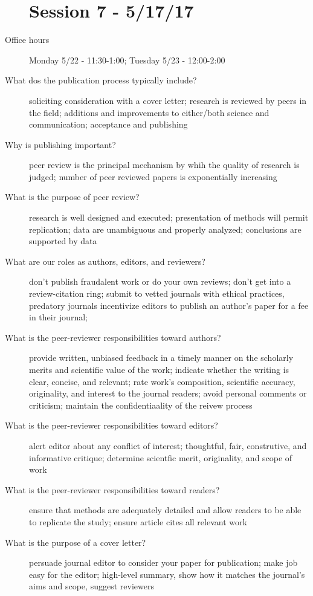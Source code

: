 \documentclass[10pt]{article}
\begin{document}
\begin{description}
\section{Session 7 - 5/17/17}
\item[Office hours]
    Monday 5/22 - 11:30-1:00;
    Tuesday 5/23 - 12:00-2:00
\item[What dos the publication process typically include?]
    soliciting consideration with a cover letter;
    research is reviewed by peers in the field;
    additions and improvements to either/both science and communication;
    acceptance and publishing
\item[Why is publishing important?]
    peer review is the principal mechanism by whih the quality of research is judged;
    number of peer reviewed papers is exponentially increasing
\item[What is the purpose of peer review?]
    research is well designed and executed;
    presentation of methods will permit replication;
    data are unambiguous and properly analyzed;
    conclusions are supported by data
\item[What are our roles as authors, editors, and reviewers?]
    don't publish fraudalent work or do your own reviews;
    don't get into a review-citation ring;
    submit to vetted journals with ethical practices, predatory journals incentivize editors to publish an author's paper for a fee in their journal;
\item[What is the peer-reviewer responsibilities toward authors?]
    provide written, unbiased feedback in a timely manner on the scholarly merits and scientific value of the work;
    indicate whether the  writing is clear, concise, and relevant;
    rate work's composition, scientific accuracy, originality, and interest to the journal readers;
    avoid personal comments or criticism;
    maintain the confidentiaality of  the reivew process
\item[What is the peer-reviewer responsibilities toward editors?]
    alert editor about any conflict of interest;
    thoughtful, fair, construtive, and informative critique;
    determine scientfic merit, originality, and scope of work
\item[What is the peer-reviewer responsibilities toward readers?]
    ensure that methods are adequately detailed and allow readers to be able to replicate the study;
    ensure article cites all relevant work
\item[What is the purpose of a cover letter?]
    persuade journal editor to consider your paper for publication;
    make job easy for the editor;
    high-level summary, show how it matches the journal's aims and scope, suggest reviewers
\end{description}
\end{document}
